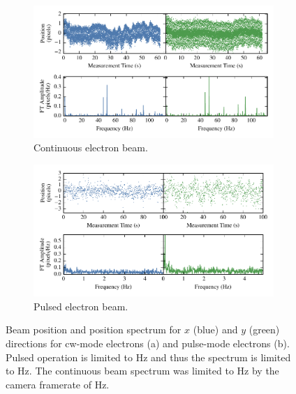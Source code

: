 \begin{figure}
    \begin{subfigure}{\linewidth}
    \centering
    \includegraphics{part2/Figs/cw_beam_stability.pdf}
    \caption{Continuous electron beam.}
    \label{figure:cw_stability}
    \end{subfigure}

    \begin{subfigure}{\linewidth}
    \centering
    \includegraphics{part2/Figs/pulse_beam_stability.pdf}
    \caption{Pulsed electron beam.}
    \label{figure:pulse_stability}
    \end{subfigure}
    \caption[Beam stability for continuous and pulsed operation.]{Beam position and position spectrum for $x$ (blue) and $y$ (green) directions for \gls{cw}-mode electrons (a) and pulse-mode electrons (b).
    Pulsed operation is limited to \unit[10]{Hz} and thus the spectrum is limited to \unit[5]{Hz}. The continuous beam spectrum was limited to \unit[120]{Hz} by the camera framerate of \unit[240]{Hz}.}
    \label{figure:stability}
\end{figure}


